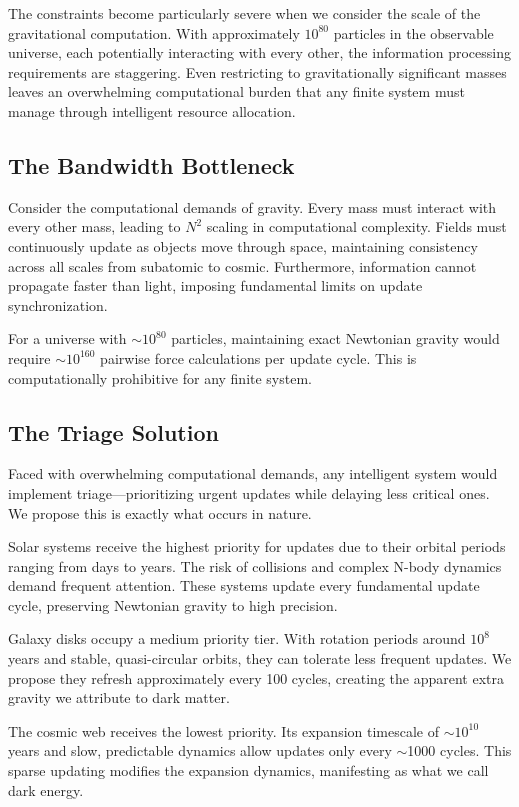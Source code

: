 \documentclass[twocolumn,prd,amsmath,amssymb,aps,superscriptaddress,nofootinbib]{revtex4-2}
\begin{document}
The constraints become particularly severe when we consider the scale of the gravitational computation. With approximately $10^{80}$ particles in the observable universe, each potentially interacting with every other, the information processing requirements are staggering. Even restricting to gravitationally significant masses leaves an overwhelming computational burden that any finite system must manage through intelligent resource allocation.

\subsection{The Bandwidth Bottleneck}

Consider the computational demands of gravity. Every mass must interact with every other mass, leading to $N^2$ scaling in computational complexity. Fields must continuously update as objects move through space, maintaining consistency across all scales from subatomic to cosmic. Furthermore, information cannot propagate faster than light, imposing fundamental limits on update synchronization.

For a universe with $\sim 10^{80}$ particles, maintaining exact Newtonian gravity would require $\sim 10^{160}$ pairwise force calculations per update cycle. This is computationally prohibitive for any finite system.

\subsection{The Triage Solution}

Faced with overwhelming computational demands, any intelligent system would implement triage---prioritizing urgent updates while delaying less critical ones. We propose this is exactly what occurs in nature.

Solar systems receive the highest priority for updates due to their orbital periods ranging from days to years. The risk of collisions and complex N-body dynamics demand frequent attention. These systems update every fundamental update cycle, preserving Newtonian gravity to high precision.

Galaxy disks occupy a medium priority tier. With rotation periods around $10^8$ years and stable, quasi-circular orbits, they can tolerate less frequent updates. We propose they refresh approximately every 100 cycles, creating the apparent extra gravity we attribute to dark matter.

The cosmic web receives the lowest priority. Its expansion timescale of $\sim 10^{10}$ years and slow, predictable dynamics allow updates only every $\sim$1000 cycles. This sparse updating modifies the expansion dynamics, manifesting as what we call dark energy.
\end{document}
